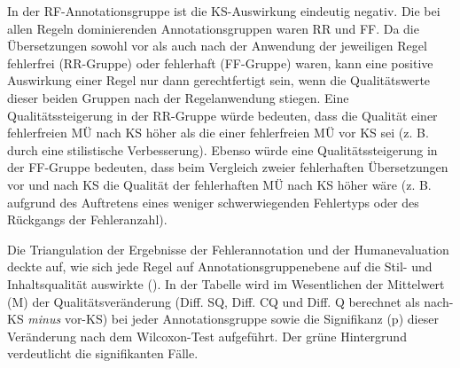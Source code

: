 In der RF-Annotationsgruppe ist die KS-Auswirkung eindeutig negativ. Die bei allen Regeln dominierenden Annotationsgruppen waren RR und FF. Da die Übersetzungen sowohl vor als auch nach der Anwendung der jeweiligen Regel fehlerfrei (RR-Gruppe) oder fehlerhaft (FF-Gruppe) waren, kann eine positive Auswirkung einer Regel nur dann gerechtfertigt sein, wenn die Qualitätswerte dieser beiden Gruppen nach der Regelanwendung stiegen. Eine Qualitätssteigerung in der RR-Gruppe würde bedeuten, dass die Qualität einer fehlerfreien MÜ nach KS höher als die einer fehlerfreien MÜ vor KS sei (z. B. durch eine stilistische Verbesserung). Ebenso würde eine Qualitätssteigerung in der FF-Gruppe bedeuten, dass beim Vergleich zweier fehlerhaften Übersetzungen vor und nach KS die Qualität der fehlerhaften MÜ nach KS höher wäre (z. B. aufgrund des Auftretens eines weniger schwerwiegenden Fehlertyps oder des Rückgangs der Fehleranzahl).

Die Triangulation der Ergebnisse der Fehlerannotation und der Humanevaluation deckte auf, wie sich jede Regel auf Annotationsgruppenebene auf die Stil- und Inhaltsqualität auswirkte (). In der Tabelle wird im Wesentlichen der Mittelwert (M) der Qualitätsveränderung (Diff. SQ, Diff. CQ und Diff. Q berechnet als nach-KS \textit{minus} vor-KS) bei jeder Annotationsgruppe sowie die Signifikanz (p) dieser Veränderung nach dem Wilcoxon-Test aufgeführt. Der grüne Hintergrund verdeutlicht die signifikanten Fälle.

